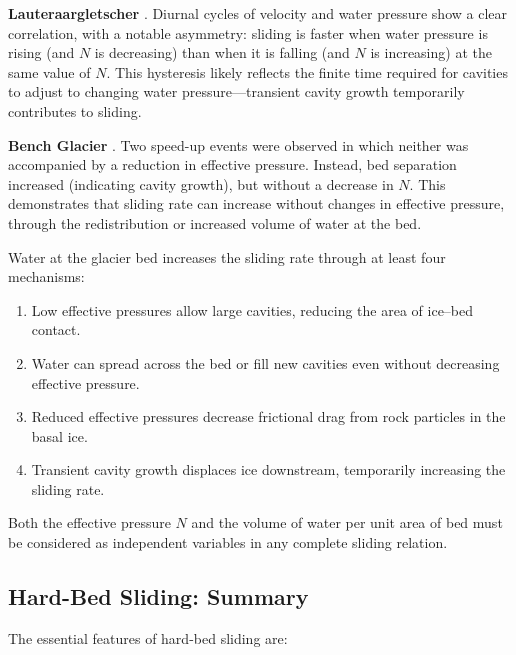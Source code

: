 \documentclass[11pt]{article}
\begin{document}
\medskip
\noindent\textbf{Lauteraargletscher} \cite{SugiyamaGudmundsson2004}.  Diurnal cycles of velocity and water pressure show a clear correlation, with a notable asymmetry: sliding is faster when water pressure is rising (and $N$ is decreasing) than when it is falling (and $N$ is increasing) at the same value of $N$.  This hysteresis likely reflects the finite time required for cavities to adjust to changing water pressure---transient cavity growth temporarily contributes to sliding.

\medskip
\noindent\textbf{Bench Glacier} \cite{Harperetal2005,Harperetal2007}.  Two speed-up events were observed in which neither was accompanied by a reduction in effective pressure.  Instead, bed separation increased (indicating cavity growth), but without a decrease in $N$.  This demonstrates that sliding rate can increase without changes in effective pressure, through the redistribution or increased volume of water at the bed.

\begin{tcolorbox}[
  colback=blue!5,
  colframe=blue!50!black,
  title={\textbf{Key point: water pressure is necessary but not sufficient}}
]
Water at the glacier bed increases the sliding rate through at least four mechanisms:
\begin{enumerate}
  \item Low effective pressures allow large cavities, reducing the area of ice--bed contact.
  \item Water can spread across the bed or fill new cavities even without decreasing effective pressure.
  \item Reduced effective pressures decrease frictional drag from rock particles in the basal ice.
  \item Transient cavity growth displaces ice downstream, temporarily increasing the sliding rate.
\end{enumerate}
Both the effective pressure $N$ and the volume of water per unit area of bed must be considered as independent variables in any complete sliding relation.
\end{tcolorbox}

\subsection{Hard-Bed Sliding: Summary}
\label{sec:hard_bed_summary}

The essential features of hard-bed sliding are:
\end{document}

